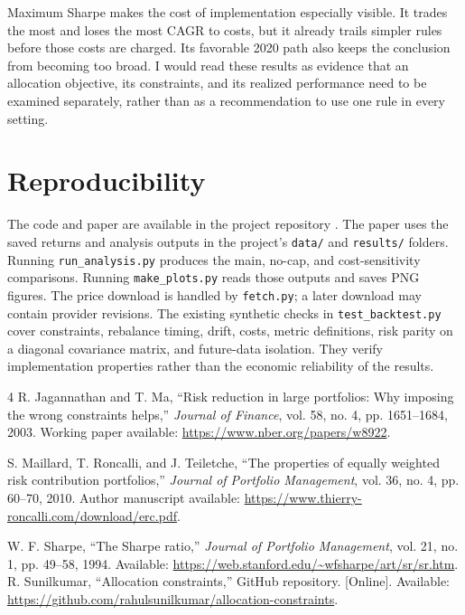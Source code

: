 \documentclass[conference]{IEEEtran}
\begin{document}
Maximum Sharpe makes the cost of implementation especially visible. It trades the most and loses the most CAGR to costs, but it already trails simpler rules before those costs are charged. Its favorable 2020 path also keeps the conclusion from becoming too broad. I would read these results as evidence that an allocation objective, its constraints, and its realized performance need to be examined separately, rather than as a recommendation to use one rule in every setting.

\section*{Reproducibility}
The code and paper are available in the project repository \cite{repository}. The paper uses the saved returns and analysis outputs in the project's \texttt{data/} and \texttt{results/} folders. Running \texttt{run\_analysis.py} produces the main, no-cap, and cost-sensitivity comparisons. Running \texttt{make\_plots.py} reads those outputs and saves PNG figures. The price download is handled by \texttt{fetch.py}; a later download may contain provider revisions. The existing synthetic checks in \texttt{test\_backtest.py} cover constraints, rebalance timing, drift, costs, metric definitions, risk parity on a diagonal covariance matrix, and future-data isolation. They verify implementation properties rather than the economic reliability of the results.

\balance
\begin{thebibliography}{4}
R. Jagannathan and T. Ma, ``Risk reduction in large portfolios: Why imposing the wrong constraints helps,'' \emph{Journal of Finance}, vol. 58, no. 4, pp. 1651--1684, 2003. Working paper available: \url{https://www.nber.org/papers/w8922}.

S. Maillard, T. Roncalli, and J. Teiletche, ``The properties of equally weighted risk contribution portfolios,'' \emph{Journal of Portfolio Management}, vol. 36, no. 4, pp. 60--70, 2010. Author manuscript available: \url{https://www.thierry-roncalli.com/download/erc.pdf}.

W. F. Sharpe, ``The Sharpe ratio,'' \emph{Journal of Portfolio Management}, vol. 21, no. 1, pp. 49--58, 1994. Available: \url{https://web.stanford.edu/~wfsharpe/art/sr/sr.htm}.
R. Sunilkumar, ``Allocation constraints,'' GitHub repository. [Online]. Available: \url{https://github.com/rahulsunilkumar/allocation-constraints}.
\end{thebibliography}
\end{document}
